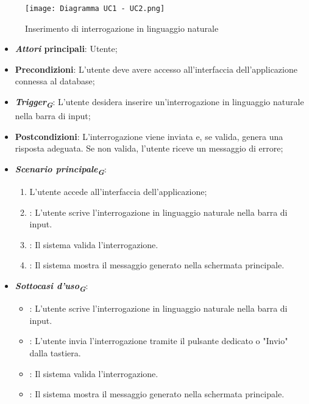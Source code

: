 \begin{figure}[h]
    \centering
    \texttt{[image: Diagramma UC1 - UC2.png]}
    \caption{Inserimento di interrogazione in linguaggio naturale}
\end{figure}

\begin{itemize}
    \item \textbf{\emph{Attori} principali}: Utente;
    \item \textbf{Precondizioni}: L'utente deve avere accesso all'interfaccia dell'applicazione connessa al database;
    \item \textbf{\emph{Trigger}\textsubscript{\textbf{\textit{G}}}}: L'utente desidera inserire un'interrogazione in linguaggio naturale nella barra di input;
    \item \textbf{Postcondizioni}: L'interrogazione viene inviata e, se valida, genera una risposta adeguata. Se non valida, l'utente riceve un messaggio di errore;
    \item \textbf{\emph{Scenario principale}\textsubscript{\textbf{\textit{G}}}}:
    \begin{enumerate}
        \item L'utente accede all'interfaccia dell'applicazione;
        \item {}: L'utente scrive l'interrogazione in linguaggio naturale nella barra di input.
        \item {}: Il sistema valida l'interrogazione.
        \item {}: Il sistema mostra il messaggio generato nella schermata principale.
    \end{enumerate}
    \item \textbf{\emph{Sottocasi d'uso}\textsubscript{\textbf{\textit{G}}}}:
    \begin{itemize}
        \item {}: L'utente scrive l'interrogazione in linguaggio naturale nella barra di input.
        \item {}: L'utente invia l'interrogazione tramite il pulsante dedicato o "Invio" dalla tastiera.
        \item {}: Il sistema valida l'interrogazione.
        \item {}: Il sistema mostra il messaggio generato nella schermata principale.
    \end{itemize}

\end{itemize}
